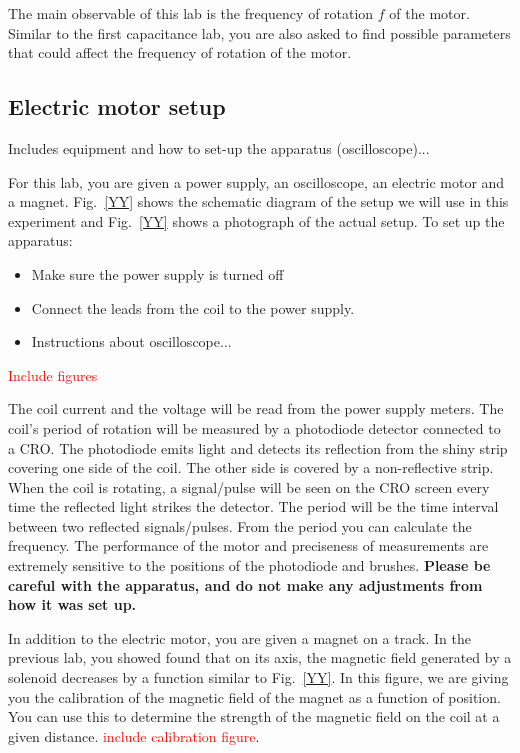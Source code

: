 \documentclass[12pt]{report}
\def \todo #1{\textcolor{red}{#1}}
\begin{document}
The main observable of this lab is the frequency of rotation $f$ of the motor. Similar to the first capacitance lab, you are also asked to find possible parameters that could affect the frequency of rotation of the motor.

\subsection{Electric motor setup}
Includes equipment and how to set-up the apparatus (oscilloscope)...

For this lab, you are given a power supply, an oscilloscope, an electric motor and a magnet. 
Fig.~\ref{YY} shows the schematic diagram of the setup we will use in this experiment and Fig.~\ref{YY} shows a photograph of the actual setup. To set up the apparatus:
\begin{itemize}
\item Make sure the power supply is turned off
\item Connect the leads from the coil to the power supply.
\item Instructions about oscilloscope...
\end{itemize}
\todo{Include figures}

The coil current and the voltage will be read from the power supply meters. The coil's period of rotation will be measured by a photodiode detector connected to a CRO. The photodiode emits light and detects its reflection from the shiny strip covering one side of the coil. The other side is covered by a non-reflective strip. When the coil is rotating, a signal/pulse will be seen on the CRO screen every time the reflected light strikes the detector. The period will be the time interval between two reflected signals/pulses. From the period you can calculate the frequency. The performance of the motor and preciseness of measurements are extremely sensitive to the positions of the photodiode and brushes. \textbf{Please be careful with the apparatus, and do not make any adjustments from how it was set up.}

In addition to the electric motor, you are given a magnet on a track. In the previous lab, you showed found that on its axis, the magnetic field generated by a solenoid decreases by a function similar to Fig.~\ref{YY}. In this figure, we are giving you the calibration of the magnetic field of the magnet as a function of position. You can use this to determine the strength of the magnetic field on the coil at a given distance. \todo{include calibration figure}.\\
\end{document}
